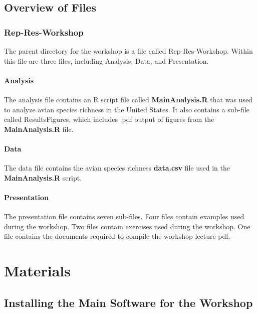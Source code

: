 \documentclass[12pt]{article}
\begin{document}
\subsection{Overview of Files}

\hypertarget{rep-res-workshop}{%
      \subsubsection{Rep-Res-Workshop}\label{rep-res-workshop}}

The parent directory for the workshop is a file called Rep-Res-Workshop. Within this file are three files, including Analysis, Data, and Presentation.

\hypertarget{analysis}{%
      \paragraph{Analysis}\label{analysis}}

The analysis file contains an R script file called \textbf{MainAnalysis.R} that was used to analyze avian species richness in the United States. It also contains a sub-file called ResultsFigures, which includes .pdf output of figures from the \textbf{MainAnalysis.R} file.

\hypertarget{data}{%
      \paragraph{Data}\label{data}}
The data file contains the avian species richness \textbf{data.csv} file used in
the \textbf{MainAnalysis.R} script.

\hypertarget{presentation}{%
      \paragraph{Presentation}\label{presentation}}

The presentation file contains seven sub-files. Four files contain examples used during the workshop. Two files contain exercises used during the workshop. One file contains the documents required to compile the workshop lecture pdf.

\section{Materials}

\hypertarget{installing-the-main-software-for-the-workshop}{%
      \subsection{Installing the Main Software for the
            Workshop}\label{installing-the-main-software-for-the-workshop}}
\end{document}
